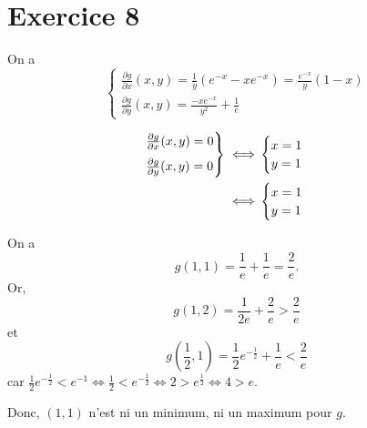 \part{Exercice 8}

On a \[
	\begin{cases}
		\frac{\partial g}{\partial x}(x,y) = \frac{1}{y}\left( e^{-x}-xe^{-x} \right) = \frac{e^{-x}}{y}(1-x)\\[3mm]
		\frac{\partial g}{\partial y}(x,y) = \frac{-xe^{-x}}{y^2} + \frac{1}{e}
	\end{cases}
\]

\begin{align*}
	\begin{rcases*}
		\frac{\partial g}{\partial x}(x,y) = 0\\[1mm]
		\frac{\partial g}{\partial y}(x,y) = 0
	\end{rcases*} \iff& \begin{cases}
		x = 1\\
		y = 1
	\end{cases}\\
	\iff& \begin{cases}
		x = 1\\
		y = 1
	\end{cases}
\end{align*}

On a \[
	g(1,1) = \frac{1}{e} + \frac{1}{e} = \frac{2}{e}.
\]
Or, \[
	g(1,2) = \frac{1}{2e} + \frac{2}{e} > \frac{2}{e}
\] et \[
	g\left( \frac{1}{2}, 1 \right) = \frac{1}{2}e^{-\frac{1}{2}} + \frac{1}{e} < \frac{2}{e}
\] car $\frac{1}{2}e^{-\frac{1}{2}} < e^{-1} \iff \frac{1}{2} < e^{-\frac{1}{2}} \iff 2 > e^{\frac{1}{2}} \iff 4 > e$.

Donc, $(1,1)$ n'est ni un minimum, ni un maximum pour $g$.
